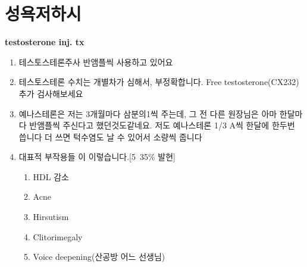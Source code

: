 \section{성욕저하시}
\textbf{testosterone inj. tx}
\begin{enumerate}[가.]\tightlist
\item 테스토스테론주사 반앰플씩 사용하고 있어요
\item 테스토스테론 수치는 개별차가 심해서, 부정확합니다. Free testosterone(CX232)  추가 검사해보세요
\item 예나스테론은 저는 3개월마다 삼분의1씩 주는데, 그 전 다른 원장님은 아마 한달마다 반앰플씩 주신다고 했던것도같네요. 저도 예나스테론 1/3 A씩 한달에 한두번 씁니다 더 쓰면 턱수염도 날 수 있어서 소량씩 줍니다
\item 대표적 부작용들 이 이렇습니다.[5~35\% 발현]
	\begin{enumerate}[1)]\tightlist
	\item HDL 감소
	\item Acne
	\item Hirsutism
	\item Clitorimegaly
	\item Voice deepening(산공방 어느 선생님)
	\end{enumerate}
\end{enumerate}
